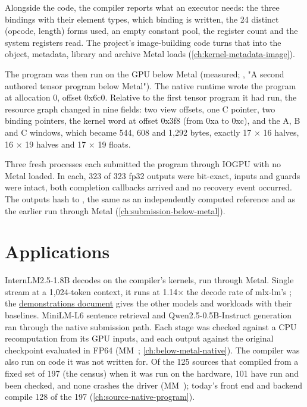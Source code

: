 Alongside the code, the compiler reports what an executor needs: the three bindings with their element types, which
binding is written, the 24 distinct (opcode, length) forms used, an empty constant pool, the register count and
the system registers read. The project's image-building code turns that into the object, metadata, library and archive Metal loads (\cref{ch:kernel-metadata-image}).

The program was then run on the GPU below Metal (measured; , "A second authored tensor program
below Metal"). The native runtime wrote the program at allocation 0, offset 0x6c0. Relative to the first tensor
program it had run, the resource graph changed in nine fields: two view offsets, one C pointer, two binding pointers, the kernel
word at offset 0x3f8 (from 0xa to 0xc), and the A, B and C windows, which became 544, 608 and
1,292 bytes, exactly 17 × 16 halves, 16 × 19 halves and 17 × 19 floats.

Three fresh processes each submitted the program through IOGPU with no Metal loaded. In each, 323 of 323 fp32 outputs
were bit-exact, inputs and guards were intact, both completion callbacks arrived and no recovery event occurred. The
outputs hash to , the same as an independently
computed reference and as the earlier run through Metal (\cref{ch:submission-below-metal}).

\section{Applications}\label{sec:understanding-supports}

InternLM2.5-1.8B decodes on the compiler's kernels, run through Metal. Single stream at a 1,024-token context, it runs
at 1.14× the decode rate of mlx-lm's ; the
\href{https://github.com/sbryngelson/AGXForge/blob/main/docs/demonstrations.md}{demonstrations document} gives the other models and
workloads with their baselines. MiniLM-L6 sentence retrieval and Qwen2.5-0.5B-Instruct generation ran through the native
submission path. Each stage was checked against a CPU recomputation from its GPU inputs, and each output against the
original checkpoint evaluated in FP64 (MM~; \cref{ch:below-metal-native}). The compiler
was also run on code it was not written for. Of the 125 sources that compiled from a fixed set of 197 (the census) when it
was run on the hardware, 101 have run and been checked, and none crashes the driver (MM~); today's front end
and backend compile 128 of the 197 (\cref{ch:source-native-program}).

